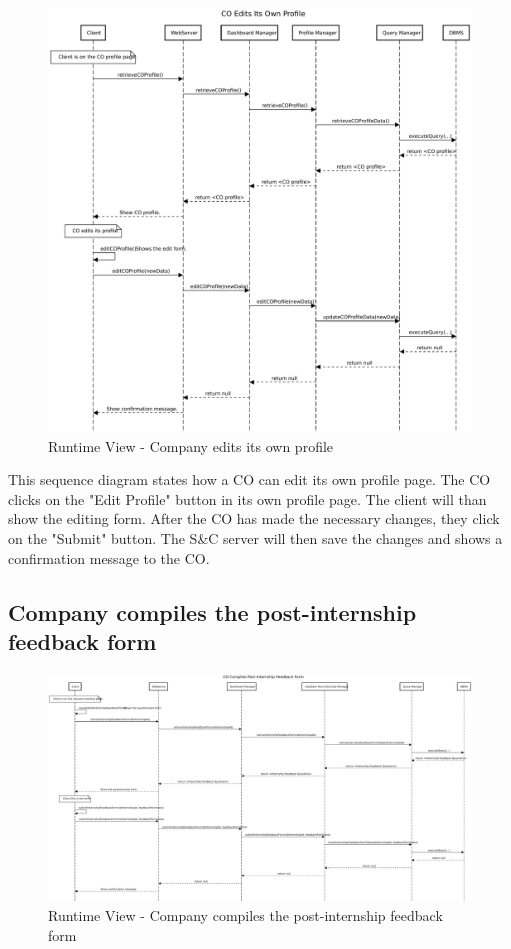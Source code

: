 \begin{figure}[H]
      \centering
      \includegraphics[width=1.0\textwidth]{Images/RV_09.pdf}
      \caption{Runtime View - Company edits its own profile}
      \label{fig:rv-co-edits-profile}
\end{figure}

\par This sequence diagram states how a CO can edit its own profile page. The CO clicks on the "Edit Profile" button
in its own profile page. The client will than show the editing form. After the CO has made the necessary changes,
they click on the "Submit" button. The S\&C server will then save the changes and shows a confirmation message to the
CO.

\subsection{Company compiles the post-internship feedback form}
\label{sub:company-compiles-the-post-internship-feedback-form}%

\begin{figure}[H]
      \centering
      \includegraphics[width=1.0\textwidth]{Images/RV_10.pdf}
      \caption{Runtime View - Company compiles the post-internship feedback form}
      \label{fig:rv-co-compiles-feedback-form}
\end{figure}

